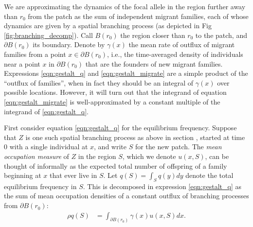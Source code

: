 \documentclass{article}
\newcommand{\linelabel}[1]{}
\newcommand{\E}{\mathbb{E}}
\newcommand{\secref}[1]{{\emph{\nameref{#1}}}}
\begin{document}
We are approximating the dynamics of the focal allele in the region further away than $r_0$ from the patch
as the sum of independent migrant families, each of whose dynamics are
given by a spatial branching process (as depicted in Fig \ref{fig:branching_decomp}).
Call $B(r_0)$ the region closer than $r_0$ to the patch, and $\partial B(r_0)$ its boundary.
Denote by $\gamma(x)$ the mean rate of outflux of migrant families from a point $x \in \partial B(r_0)$,
i.e., the time-averaged density of individuals near a point $x$ in $\partial B(r_0)$ 
that are the founders of new migrant families.
Expressions \eqref{eqn:gestalt_q} and \eqref{eqn:gestalt_migrate} are a simple product of the ``outflux of families'',
when in fact they should be an integral of $\gamma(x)$ over possible locations. \linelabel{rr:awkward}
However,
it will turn out that the integrand of equation \eqref{eqn:gestalt_migrate} 
is well-approximated by a constant multiple of the integrand of \eqref{eqn:gestalt_q}.

First consider equation \eqref{eqn:gestalt_q} for the equilibrium frequency.
Suppose that $Z$ is one such spatial branching process as above in section \secref{ss:migrant_math}, 
started at time 0 with a single individual at $x$,
and write $S$ for the new patch.
The \emph{mean occupation measure} of $Z$ in the region $S$,
which we denote $u(x,S)$,
can be thought of informally \linelabel{rr:density}
as the expected total number of offspring of a family beginning at $x$ that ever live in $S$.
Let $q(S) = \int_S q(y) dy$ denote the total equilibrium frequency in $S$.
This is decomposed in expression \eqref{eqn:gestalt_q} 
as the sum of mean occupation densities of a constant outflux of branching processes
from $\partial B(r_0)$:
\begin{align} \label{eqn:occupation_integral}
    \rho q(S) &= \int_{\partial B(r_0)} \gamma(x) u(x,S) dx  . 
\end{align}
\end{document}

